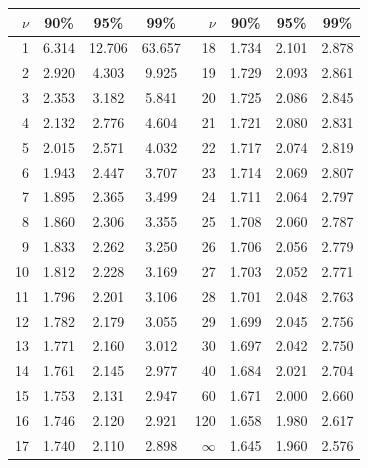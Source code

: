 \begin{center}
\small
\begin{tabular}{@{}rccc@{\hspace{2.2em}}rccc@{}}
\toprule
$\nu$ & 90\% & 95\% & 99\% & $\nu$ & 90\% & 95\% & 99\% \\
\midrule
1 & 6.314 & 12.706 & 63.657 & 18 & 1.734 & 2.101 & 2.878 \\
2 & 2.920 & 4.303 & 9.925 & 19 & 1.729 & 2.093 & 2.861 \\
3 & 2.353 & 3.182 & 5.841 & 20 & 1.725 & 2.086 & 2.845 \\
4 & 2.132 & 2.776 & 4.604 & 21 & 1.721 & 2.080 & 2.831 \\
5 & 2.015 & 2.571 & 4.032 & 22 & 1.717 & 2.074 & 2.819 \\
6 & 1.943 & 2.447 & 3.707 & 23 & 1.714 & 2.069 & 2.807 \\
7 & 1.895 & 2.365 & 3.499 & 24 & 1.711 & 2.064 & 2.797 \\
8 & 1.860 & 2.306 & 3.355 & 25 & 1.708 & 2.060 & 2.787 \\
9 & 1.833 & 2.262 & 3.250 & 26 & 1.706 & 2.056 & 2.779 \\
10 & 1.812 & 2.228 & 3.169 & 27 & 1.703 & 2.052 & 2.771 \\
11 & 1.796 & 2.201 & 3.106 & 28 & 1.701 & 2.048 & 2.763 \\
12 & 1.782 & 2.179 & 3.055 & 29 & 1.699 & 2.045 & 2.756 \\
13 & 1.771 & 2.160 & 3.012 & 30 & 1.697 & 2.042 & 2.750 \\
14 & 1.761 & 2.145 & 2.977 & 40 & 1.684 & 2.021 & 2.704 \\
15 & 1.753 & 2.131 & 2.947 & 60 & 1.671 & 2.000 & 2.660 \\
16 & 1.746 & 2.120 & 2.921 & 120 & 1.658 & 1.980 & 2.617 \\
17 & 1.740 & 2.110 & 2.898 & $\infty$ & 1.645 & 1.960 & 2.576 \\
\bottomrule
\end{tabular}
\end{center}

